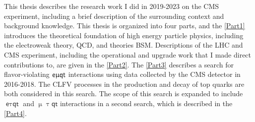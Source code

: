 This thesis describes the research work I did in 2019-2023 on the \ac{CMS} experiment, including a brief description of the surrounding context and background knowledge. This thesis is organized into four parts, and the \autoref{Part1} introduces the theoretical foundation of high energy particle physics, including the electroweak theory, \ac{QCD}, and theories \ac{BSM}. Descriptions of the \ac{LHC} and {CMS} experiment, including the operational and upgrade work that I made direct contributions to, are given in the \autoref{Part2}. The \autoref{Part3} describes a search for flavor-violating $\textsf{e}\upmu\textsf{{q}t}$ interactions using data collected by the \ac{CMS} detector in 2016-2018. The \ac{CLFV} processes in the production and decay of top quarks are both considered in this search. The scope of this search is expanded to include $\textsf{e}\uptau\textsf{qt}$ and $\upmu\uptau\textsf{qt}$ interactions in a second search, which is described in the \autoref{Part4}.




